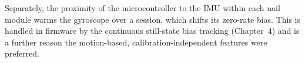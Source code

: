 Separately, the proximity of the microcontroller to the IMU within each nail
module warms the gyroscope over a session, which shifts its zero-rate bias.
This is handled in firmware by the continuous still-state bias tracking
(Chapter~4) and is a further reason the motion-based, calibration-independent
features were preferred.
